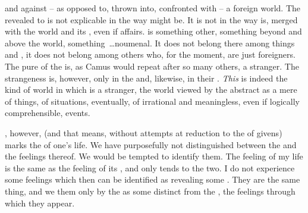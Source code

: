 \pa {} and  against -- as opposed to,
thrown into, confronted with -- a foreign world.  The  revealed to
 is not explicable in the way  might be. It is not
 in the way  is, merged with the world and its
, even if  affairs.  is something other, something
beyond and above the world, something~\ldots noumenal.  It does not belong there
among things and , it does not belong among others who, for the
moment, are just foreigners. The pure  of the 
is, as Camus would repeat after so many others, a stranger.  The strangeness is,
however, only in the  and, likewise, in their
. {\em This} is indeed the kind of world in which 
is a stranger, the world viewed by the abstract  as a mere
 of things, of  situations, eventually, of
irrational and meaningless, even if logically comprehensible, events.

, however, (and that means, without attempts at reduction to
the  of  givens)  marks the
 of one's life.  We have purposefully not distinguished between
the  and the feelings thereof. We would be tempted to
identify them. The feeling of {my life}
is the same as the feeling of its , and only  tends
to  the two. I do not experience some feelings which then can be
identified as revealing some . They are the same thing, and we
 them only by  the  as some
 distinct from the , the feelings through which they
appear.


